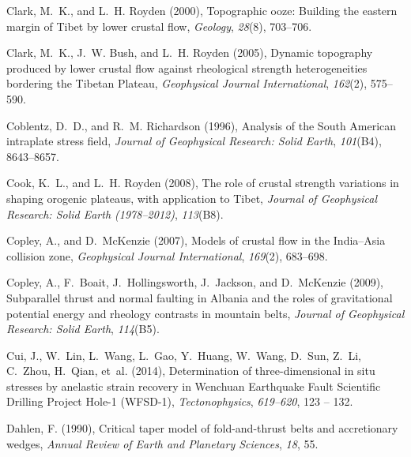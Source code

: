\documentclass[twocolumn,jgrga]{AGUTeX}
\begin{document}
\begin{article}
{{{\begin{thebibliography}{89}
Clark, M.~K., and L.~H. Royden (2000), Topographic ooze: {B}uilding the eastern
  margin of {T}ibet by lower crustal flow, \textit{Geology}, \textit{28}(8),
  703--706.

Clark, M.~K., J.~W. Bush, and L.~H. Royden (2005), Dynamic topography produced
  by lower crustal flow against rheological strength heterogeneities bordering
  the {T}ibetan {P}lateau, \textit{Geophysical Journal International},
  \textit{162}(2), 575--590.

Coblentz, D.~D., and R.~M. Richardson (1996), Analysis of the {S}outh
  {A}merican intraplate stress field, \textit{Journal of Geophysical Research:
  Solid Earth}, \textit{101}(B4), 8643--8657.

Cook, K.~L., and L.~H. Royden (2008), The role of crustal strength variations
  in shaping orogenic plateaus, with application to {T}ibet, \textit{Journal of
  Geophysical Research: Solid Earth (1978--2012)}, \textit{113}(B8).

Copley, A., and D.~McKenzie (2007), Models of crustal flow in the
  {I}ndia--{A}sia collision zone, \textit{Geophysical Journal International},
  \textit{169}(2), 683--698.

Copley, A., F.~Boait, J.~Hollingsworth, J.~Jackson, and D.~McKenzie (2009),
  Subparallel thrust and normal faulting in {A}lbania and the roles of
  gravitational potential energy and rheology contrasts in mountain belts,
  \textit{Journal of Geophysical Research: Solid Earth}, \textit{114}(B5).

Cui, J., W.~Lin, L.~Wang, L.~Gao, Y.~Huang, W.~Wang, D.~Sun, Z.~Li, C.~Zhou,
  H.~Qian, et~al. (2014), Determination of three-dimensional in situ stresses
  by anelastic strain recovery in {W}enchuan {E}arthquake {F}ault {S}cientific
  {D}rilling {P}roject {H}ole-1 ({W}{F}{S}{D}-1), \textit{Tectonophysics},
  \textit{619–620}, 123 -- 132.

Dahlen, F. (1990), Critical taper model of fold-and-thrust belts and
  accretionary wedges, \textit{Annual Review of Earth and Planetary Sciences},
  \textit{18}, 55.


\end{thebibliography}}}}
\end{article}
\end{document}
